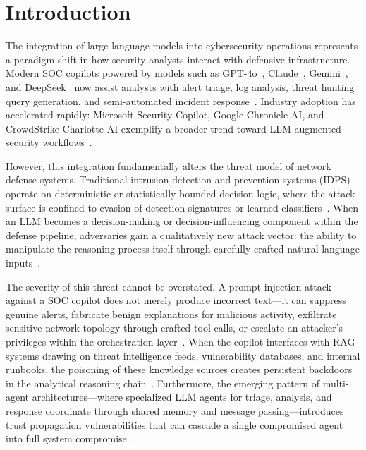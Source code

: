 \documentclass[journal,twoside]{IEEEtran}
\begin{document}
\section{Introduction}
\label{sec:introduction}

The integration of large language models into cybersecurity operations represents a paradigm shift in how security analysts interact with defensive infrastructure. Modern SOC copilots powered by models such as GPT-4o~\cite{openai2024gpt4o}, Claude~\cite{anthropic2024claude}, Gemini~\cite{google2024gemini}, and DeepSeek~\cite{deepseek2024v2} now assist analysts with alert triage, log analysis, threat hunting query generation, and semi-automated incident response~\cite{ferrag2024llmcyber,xu2024llmsec}. Industry adoption has accelerated rapidly: Microsoft Security Copilot, Google Chronicle AI, and CrowdStrike Charlotte AI exemplify a broader trend toward LLM-augmented security workflows~\cite{microsoft2024copilot,crowdstrike2024charlotte}.

However, this integration fundamentally alters the threat model of network defense systems. Traditional intrusion detection and prevention systems (IDPS) operate on deterministic or statistically bounded decision logic, where the attack surface is confined to evasion of detection signatures or learned classifiers~\cite{mirsky2023threat}. When an LLM becomes a decision-making or decision-influencing component within the defense pipeline, adversaries gain a qualitatively new attack vector: the ability to manipulate the reasoning process itself through carefully crafted natural-language inputs~\cite{greshake2023indirect,perez2022ignore}.

The severity of this threat cannot be overstated. A prompt injection attack against a SOC copilot does not merely produce incorrect text---it can suppress genuine alerts, fabricate benign explanations for malicious activity, exfiltrate sensitive network topology through crafted tool calls, or escalate an attacker's privileges within the orchestration layer~\cite{liu2024prompt,yi2024jailbreak}. When the copilot interfaces with RAG systems drawing on threat intelligence feeds, vulnerability databases, and internal runbooks, the poisoning of these knowledge sources creates persistent backdoors in the analytical reasoning chain~\cite{zou2024poisonedrag,chaudhari2024rag}. Furthermore, the emerging pattern of multi-agent architectures---where specialized LLM agents for triage, analysis, and response coordinate through shared memory and message passing---introduces trust propagation vulnerabilities that can cascade a single compromised agent into full system compromise~\cite{cohen2024multiagent,wu2024autogen}.
\end{document}
